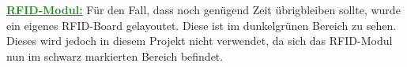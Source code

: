 \textcolor{ForestGreen}{\textbf{\underline{RFID-Modul:}}}
Für den Fall, dass noch genügend Zeit übrigbleiben sollte, wurde ein eigenes RFID-Board gelayoutet. Diese ist im dunkelgrünen Bereich zu sehen. Dieses wird jedoch in diesem Projekt nicht verwendet, da sich das RFID-Modul nun im schwarz markierten Bereich befindet. 